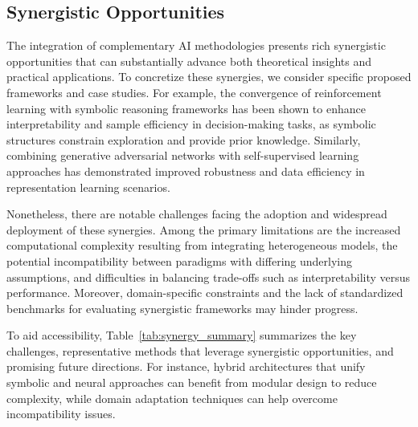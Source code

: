 \documentclass[sigconf]{acmart}
\begin{document}
\subsection{Synergistic Opportunities}

The integration of complementary AI methodologies presents rich synergistic opportunities that can substantially advance both theoretical insights and practical applications. To concretize these synergies, we consider specific proposed frameworks and case studies. For example, the convergence of reinforcement learning with symbolic reasoning frameworks has been shown to enhance interpretability and sample efficiency in decision-making tasks, as symbolic structures constrain exploration and provide prior knowledge. Similarly, combining generative adversarial networks with self-supervised learning approaches has demonstrated improved robustness and data efficiency in representation learning scenarios.

Nonetheless, there are notable challenges facing the adoption and widespread deployment of these synergies. Among the primary limitations are the increased computational complexity resulting from integrating heterogeneous models, the potential incompatibility between paradigms with differing underlying assumptions, and difficulties in balancing trade-offs such as interpretability versus performance. Moreover, domain-specific constraints and the lack of standardized benchmarks for evaluating synergistic frameworks may hinder progress.

To aid accessibility, Table~\ref{tab:synergy_summary} summarizes the key challenges, representative methods that leverage synergistic opportunities, and promising future directions. For instance, hybrid architectures that unify symbolic and neural approaches can benefit from modular design to reduce complexity, while domain adaptation techniques can help overcome incompatibility issues.
\end{document}

